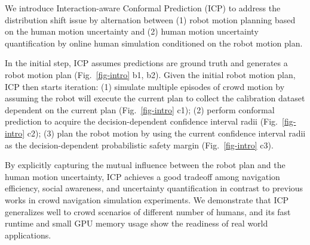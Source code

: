 We introduce Interaction-aware Conformal Prediction (ICP) to address the distribution shift issue by alternation between (1) robot motion planning based on the human motion uncertainty and (2) human motion uncertainty quantification by online human simulation conditioned on the robot motion plan.

In the initial step, ICP assumes predictions are ground truth and generates a robot motion plan (Fig.~\ref{fig-intro} b1, b2). Given the initial robot motion plan, ICP then starts iteration: (1) simulate multiple episodes of crowd motion by assuming the robot will execute the current plan to collect the calibration dataset dependent on the current plan (Fig.~\ref{fig-intro} c1); (2) perform conformal prediction to acquire the decision-dependent confidence interval radii (Fig.~\ref{fig-intro} c2); (3) plan the robot motion by using the current confidence interval radii as the decision-dependent probabilistic safety margin (Fig.~\ref{fig-intro} c3).

By explicitly capturing the mutual influence between the robot plan and the human motion uncertainty, ICP achieves a good tradeoff among navigation efficiency, social awareness, and uncertainty quantification in contrast to previous works in crowd navigation simulation experiments. We demonstrate that ICP generalizes well to crowd scenarios of different number of humans, and its fast runtime and small GPU memory usage show the readiness of real world applications.






